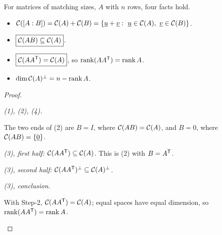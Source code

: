 \begin{result}
For matrices of matching sizes, $A$ with $n$ rows, four facts hold.
\begin{itemize}
  \item[(1)] $\C([A:B])=\C(A)+\C(B)=\{\vect{u}+\vect{v}:\ \vect{u}\in\C(A),\ \vect{v}\in\C(B)\}$.
  \item[(2)] $\boxed{\mathcal{C}(AB)\subseteq\mathcal{C}(A)}$.
  \item[(3)] $\boxed{\mathcal{C}(AA^{\mathsf{T}})=\mathcal{C}(A)}$, so $\operatorname{rank}(AA^{\mathsf{T}})=\operatorname{rank} A$.
  \item[(4)] $\dim\mathcal{C}(A)^\perp=n-\operatorname{rank} A$.
\end{itemize}
\end{result}
\begin{proof}
\begin{steps}
  \item \emph{(1), (2), (4).}
  \begin{deriv}
  \end{deriv}
  The two ends of (2) are $B=I$, where $\mathcal{C}(AB)=\mathcal{C}(A)$, and $B=0$, where $\mathcal{C}(AB)=\{\underline{0}\}$.
  \item \emph{(3), first half: $\mathcal{C}(AA^{\mathsf{T}})\subseteq\mathcal{C}(A)$.} This is (2) with $B=A^{\mathsf{T}}$.
  \item \emph{(3), second half: $\mathcal{C}(AA^{\mathsf{T}})^\perp\subseteq\mathcal{C}(A)^\perp$.}
  \begin{deriv}
  \end{deriv}
  \item \emph{(3), conclusion.}
  \begin{deriv}
  \end{deriv}
  With Step-2, $\mathcal{C}(AA^{\mathsf{T}})=\mathcal{C}(A)$; equal spaces have equal dimension, so $\operatorname{rank}(AA^{\mathsf{T}})=\operatorname{rank} A$.\qedhere
\end{steps}
\end{proof}

